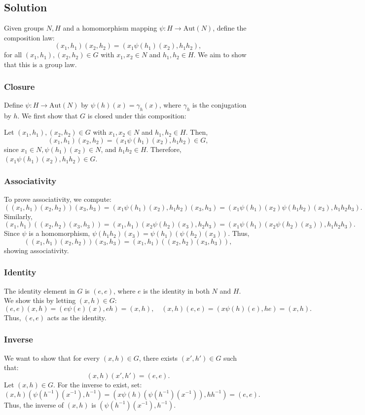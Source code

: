 \documentclass[12pt]{article}
\begin{document}
\subsection*{Solution}

Given groups \( N, H \) and a homomorphism mapping \( \psi: H \to \text{Aut}(N) \), define the composition law:
\[
(x_1, h_1) (x_2, h_2) = (x_1 \psi(h_1)(x_2), h_1 h_2),
\]
for all \( (x_1, h_1), (x_2, h_2) \in G \) with \( x_1, x_2 \in N \) and \( h_1, h_2 \in H \). We aim to show that this is a group law.

\subsubsection*{Closure}
Define \( \psi: H \to \text{Aut}(N) \) by \( \psi(h)(x) = \gamma_h(x) \), where \( \gamma_h \) is the conjugation by \( h \). We first show that \( G \) is closed under this composition:

Let \( (x_1, h_1), (x_2, h_2) \in G \) with \( x_1, x_2 \in N \) and \( h_1, h_2 \in H \). Then,
\[
(x_1, h_1) (x_2, h_2) = (x_1 \psi(h_1)(x_2), h_1 h_2) \in G,
\]
since \( x_1 \in N, \psi(h_1)(x_2) \in N \), and \( h_1 h_2 \in H \). Therefore, \( (x_1 \psi(h_1)(x_2), h_1 h_2) \in G \).

\subsubsection*{Associativity}
To prove associativity, we compute:
\[
((x_1, h_1)(x_2, h_2))(x_3, h_3) = (x_1 \psi(h_1)(x_2), h_1 h_2)(x_3, h_3) = (x_1 \psi(h_1)(x_2) \psi(h_1 h_2)(x_3), h_1 h_2 h_3).
\]
Similarly, 
\[
(x_1, h_1)((x_2, h_2)(x_3, h_3)) = (x_1, h_1)(x_2 \psi(h_2)(x_3), h_2 h_3) = (x_1 \psi(h_1)(x_2 \psi(h_2)(x_3)), h_1 h_2 h_3).
\]
Since \( \psi \) is a homomorphism, \( \psi(h_1 h_2)(x_3) = \psi(h_1)(\psi(h_2)(x_3)) \). Thus, 
\[
((x_1, h_1)(x_2, h_2))(x_3, h_3) = (x_1, h_1)((x_2, h_2)(x_3, h_3)),
\]
showing associativity.

\subsubsection*{Identity}
The identity element in \( G \) is \( (e, e) \), where \( e \) is the identity in both \( N \) and \( H \). We show this by letting \( (x, h) \in G \):
\[
(e, e)(x, h) = (e \psi(e)(x), eh) = (x, h), \quad (x, h)(e, e) = (x \psi(h)(e), he) = (x, h).
\]
Thus, \( (e, e) \) acts as the identity.

\subsubsection*{Inverse}
We want to show that for every \( (x, h) \in G \), there exists \( (x', h') \in G \) such that:
\[
(x, h)(x', h') = (e, e).
\]
Let \( (x, h) \in G \). For the inverse to exist, set:
\[
(x, h)(\psi(h^{-1})(x^{-1}), h^{-1}) = (x \psi(h)(\psi(h^{-1})(x^{-1})), hh^{-1}) = (e, e).
\]
Thus, the inverse of \( (x, h) \) is \( (\psi(h^{-1})(x^{-1}), h^{-1}) \).
\end{document}
